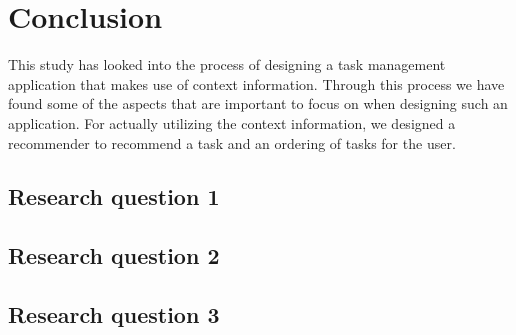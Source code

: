 \chapter{Conclusion}
\label{chap:conclusion}

This study has looked into the process of designing a task management application that makes use of context information. Through this process we have found some of the aspects that are important to focus on when designing such an application. For actually utilizing the context information, we designed a recommender to recommend a task and an ordering of tasks for the user.


\section{Research question 1}



\section{Research question 2}



\section{Research question 3}


